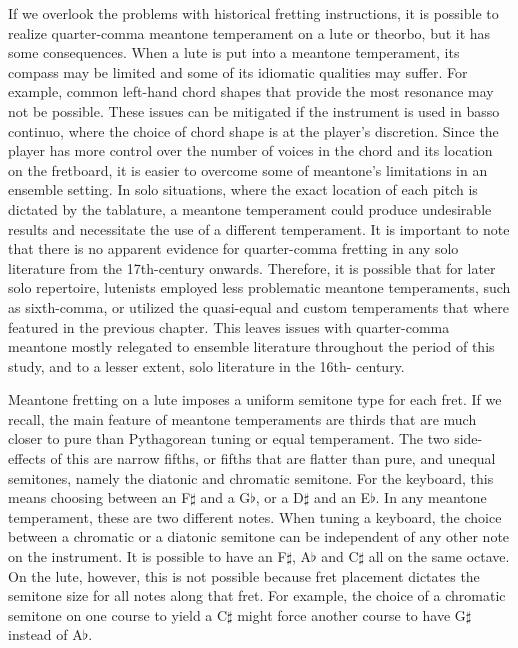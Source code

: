 If we overlook the problems with historical fretting instructions, it is
possible to realize quarter-comma meantone temperament on a lute or theorbo, but
it has some consequences.  When a lute is put into a meantone temperament, its
compass may be limited and some of its idiomatic qualities may suffer.  For
example, common left-hand chord shapes that provide the most resonance may not
be possible.  These issues can be mitigated if the instrument is used in basso
continuo, where the choice of chord shape is at the player's discretion.  Since
the player has more control over the number of voices in the chord and its
location on the fretboard, it is easier to overcome some of meantone's
limitations in an ensemble setting.  In solo situations, where the exact
location of each pitch is dictated by the tablature, a meantone temperament
could produce undesirable results and necessitate the use of a different
temperament.  It is important to note that there is no apparent evidence for
quarter-comma fretting in any solo literature from the 17th-century onwards.
Therefore, it is possible that for later solo repertoire, lutenists employed
less problematic meantone temperaments, such as sixth-comma, or utilized the
quasi-equal and custom temperaments that where featured in the previous chapter.
This leaves issues with quarter-comma meantone mostly relegated to ensemble
literature throughout the period of this study, and to a lesser extent, solo
literature in the 16th- century.

Meantone fretting on a lute imposes a uniform semitone type for each fret. If we
recall, the main feature of meantone temperaments are thirds that are much
closer to pure than Pythagorean tuning or equal temperament. The two side-
effects of this are narrow fifths, or fifths that are flatter than pure, and
unequal semitones, namely the diatonic and chromatic semitone.  For the
keyboard, this means choosing between an F$\sharp$ and a G$\flat$, or a
D$\sharp$ and an E$\flat$.  In any meantone temperament, these are two different
notes.  When tuning a keyboard, the choice between a chromatic or a diatonic
semitone can be independent of any other note on the instrument. It is possible
to have an F$\sharp$, A$\flat$ and C$\sharp$ all on the same octave.  On the
lute, however, this is not possible because fret placement dictates the semitone
size for all notes along that fret. For example, the choice of a chromatic
semitone on one course to yield a C$\sharp$ might force another course to have
G$\sharp$ instead of A$\flat$.

